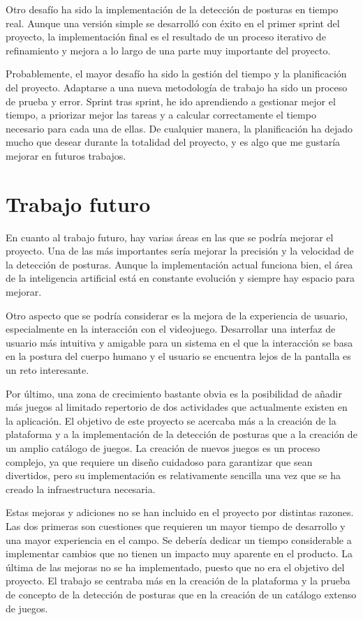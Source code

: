 Otro desafío ha sido la implementación de la detección de posturas en tiempo real. Aunque una
versión simple se desarrolló con éxito en el primer sprint del proyecto, la implementación final
es el resultado de un proceso iterativo de refinamiento y mejora a lo largo de una parte muy
importante del proyecto.

Probablemente, el mayor desafío ha sido la gestión del tiempo y la planificación del proyecto.
Adaptarse a una nueva metodología de trabajo ha sido un proceso de prueba y error. Sprint tras
sprint, he ido aprendiendo a gestionar mejor el tiempo, a priorizar mejor las tareas y a calcular
correctamente el tiempo necesario para cada una de ellas. De cualquier manera, la planificación
ha dejado mucho que desear durante la totalidad del proyecto, y es algo que me gustaría mejorar
en futuros trabajos.

\section{Trabajo futuro}
En cuanto al trabajo futuro, hay varias áreas en las que se podría mejorar el proyecto. Una de las
más importantes sería mejorar la precisión y la velocidad de la detección de posturas. Aunque
la implementación actual funciona bien, el área de la inteligencia artificial está en constante
evolución y siempre hay espacio para mejorar.

Otro aspecto que se podría considerar es la mejora de la experiencia de usuario, especialmente en
la interacción con el videojuego. Desarrollar una interfaz de usuario más intuitiva y amigable
para un sistema en el que la interacción se basa en la postura del cuerpo humano y el usuario se
encuentra lejos de la pantalla es un reto interesante.

Por último, una zona de crecimiento bastante obvia es la posibilidad de añadir más juegos al limitado
repertorio de dos actividades que actualmente existen en la aplicación. El objetivo de este proyecto
se acercaba más a la creación de la plataforma y a la implementación de la detección de posturas
que a la creación de un amplio catálogo de juegos. La creación de nuevos juegos es un proceso
complejo, ya que requiere un diseño cuidadoso para garantizar que sean divertidos, pero su
implementación es relativamente sencilla una vez que se ha creado la infraestructura necesaria.

Estas mejoras y adiciones no se han incluido en el proyecto por distintas razones. Las dos primeras
son cuestiones que requieren un mayor tiempo de desarrollo y una mayor experiencia en el campo. Se
debería dedicar un tiempo considerable a implementar cambios que no tienen un impacto muy aparente
en el producto. La última de las mejoras no se ha implementado, puesto que no era el objetivo del
proyecto. El trabajo se centraba más en la creación de la plataforma y la prueba de concepto
de la detección de posturas que en la creación de un catálogo extenso de juegos.

